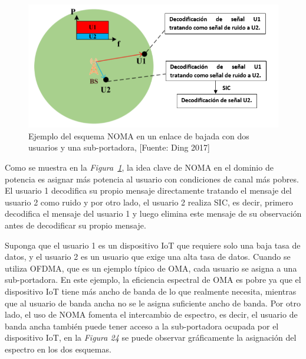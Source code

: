 \begin{figure}[th]
\centering
\includegraphics[scale=.85]{Figures/Ejemplo del esquema NOMA en un enlace de bajada con dos usuarios y una sub-portadora}
\decoRule
\caption[Ejemplo del esquema NOMA en un enlace de bajada con dos usuarios y una sub-portadora.]{Ejemplo del esquema NOMA en un enlace de bajada con dos usuarios y una sub-portadora, [Fuente: Ding 2017]}
\label{fig:NOMADL}
\end{figure}

Como se muestra en la \textit{Figura~\ref{fig:NOMADL}}, la idea clave de NOMA en el dominio de potencia es asignar más potencia al usuario con condiciones de canal más pobres. El usuario 1 decodifica su propio mensaje directamente tratando el mensaje del usuario 2 como ruido y por otro lado, el usuario 2 realiza SIC, es decir, primero decodifica el mensaje del usuario 1 y luego elimina este mensaje de su observación antes de decodificar su propio mensaje.\newline

Suponga que el usuario 1 es un dispositivo IoT que requiere solo una baja tasa de datos, y el usuario 2 es un usuario que exige una alta tasa de datos. Cuando se utiliza OFDMA, que es un ejemplo típico de OMA, cada usuario se asigna a una sub-portadora. En este ejemplo, la eficiencia espectral de OMA es pobre ya que el dispositivo IoT tiene más ancho de banda de lo que realmente necesita, mientras que al usuario de banda ancha no se le asigna suficiente ancho de banda. Por otro lado, el uso de NOMA fomenta el intercambio de espectro, es decir, el usuario de banda ancha también puede tener acceso a la sub-portadora ocupada por el dispositivo IoT, en la \textit{Figura 24} se puede observar gráficamente la asignación del espectro en los dos esquemas.\newline

